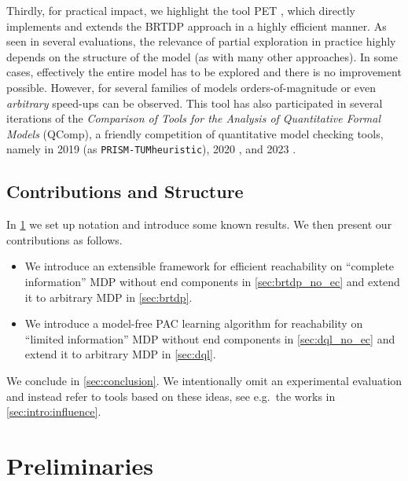 \documentclass{theoretics}
\begin{document}
Thirdly, for practical impact, we highlight the tool PET \cite{DBLP:conf/atva/Meggendorfer22,DBLP:conf/cav/MeggendorferW24}, which directly implements and extends the BRTDP approach in a highly efficient manner.
As seen in several evaluations, the relevance of partial exploration in practice highly depends on the structure of the model (as with many other approaches).
In some cases, effectively the entire model has to be explored and there is no improvement possible.
However, for several families of models orders-of-magnitude or even \emph{arbitrary} speed-ups can be observed.
This tool has also participated in several iterations of the \emph{Comparison of Tools for the Analysis of Quantitative Formal Models} (QComp), a friendly competition of quantitative model checking tools, namely in 2019 \cite{DBLP:conf/tacas/HahnHHKKKPQRS19} (as \texttt{PRISM-TUMheuristic}), 2020 \cite{DBLP:conf/isola/BuddeHKKPQTZ20}, and 2023 \cite{qcomp2023}.

\subsection{Contributions and Structure}

In \cref{sec:preliminaries} we set up notation and introduce some known results.
We then present our contributions as follows.
\begin{itemize}
	\item We introduce an extensible framework for efficient reachability on \enquote{complete information} MDP without end components in \cref{sec:brtdp_no_ec} and extend it to arbitrary MDP in \cref{sec:brtdp}.
	\item We introduce a model-free PAC learning algorithm for reachability on \enquote{limited information} MDP without end components in \cref{sec:dql_no_ec} and extend it to arbitrary MDP in \cref{sec:dql}.
\end{itemize}
We conclude in \cref{sec:conclusion}.
We intentionally omit an experimental evaluation and instead refer to tools based on these ideas, see e.g.\ the works in \cref{sec:intro:influence}.
 	\section{Preliminaries} \label{sec:preliminaries}
\end{document}
